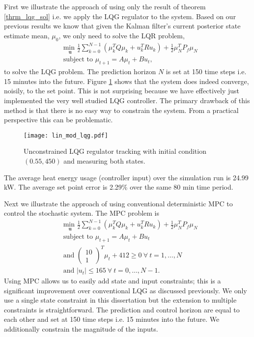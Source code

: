 First we illustrate the approach of using only the result of theorem \ref{thrm_lqg_sol} i.e. we apply the LQG regulator to the system. Based on our previous results we know that given the Kalman filter's current posterior state estimate mean, $\mu_0$, we only need to solve the LQR problem, 
\begin{equation}
\begin{aligned}
&\underset{\mathbf{u}}{\text{min }} \frac{1}{2}\sum_{k=0}^{N-1} \left( \mu_k^TQ\mu_k + u_k^TRu_k \right) + \frac{1}{2}\mu_N^TP_f\mu_N \\
& \text{subject to } \mu_{t+1}=A\mu_t + Bu_t,
\end{aligned}
\label{eq_lqg_linmod}
\end{equation}
to solve the LQG problem. The prediction horizon $N$ is set at 150 time steps i.e. 15 minutes into the future. Figure \ref{fig_lin_mod_lqg} shows that the system does indeed converge, noisily, to the set point. This is not surprising because we have effectively just implemented the very well studied LQG controller. The primary drawback of this method is that there is no easy way to constrain the system. From a practical perspective this can be problematic. 
\begin{figure}[H] 
\centering
\texttt{[image: lin\_mod\_lqg.pdf]}
\caption{Unconstrained LQG regulator tracking with initial condition $(0.55, 450)$ and measuring both states.}
\label{fig_lin_mod_lqg}
\end{figure}
The average heat energy usage (controller input) over the simulation run is 24.99 kW. The average set point error is 2.29\% over the same 80 min time period.
 
Next we illustrate the approach of using conventional deterministic MPC to control the stochastic system. The MPC problem is
\begin{equation}
\begin{aligned}
&\underset{\mathbf{u}}{\text{min }} \frac{1}{2}\sum_{k=0}^{N-1} \left( \mu_k^TQ\mu_k + u_k^TRu_k \right) + \frac{1}{2}\mu_N^TP_f\mu_N \\
& \text{subject to } \mu_{t+1}=A\mu_t + Bu_t \\
&\text{and } \begin{pmatrix}
10 \\ 1
\end{pmatrix}^T \mu_t + 412 \geq 0 ~\forall ~t=1,\hdots,N\\
& \text{and } |u_t| \leq 165 ~\forall ~t=0,\hdots,N-1.
\end{aligned}
\label{eq_mpc_constrained_det1}
\end{equation}
Using MPC allows us to easily add state and input constraints; this is a significant improvement over conventional LQG as discussed previously. We only use a single state constraint in this dissertation but the extension to multiple constraints is straightforward. The prediction and control horizon are equal to each other and set at 150 time steps i.e. 15 minutes into the future. We additionally constrain the magnitude of the inputs.

